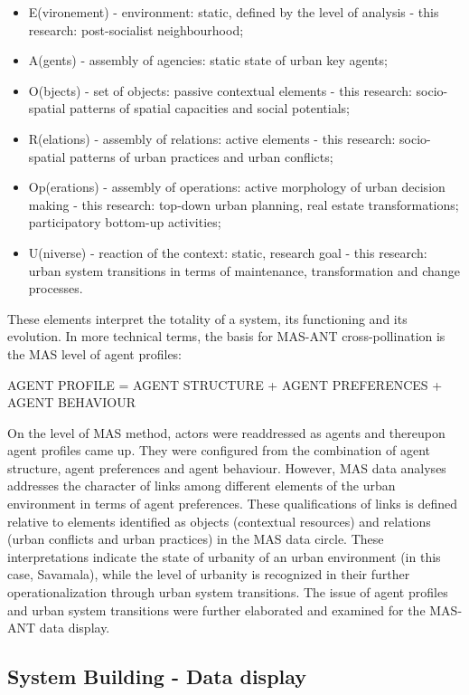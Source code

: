 \documentclass[11pt]{report}
\begin{document}
\begin{itemize}
\item E(vironement) - environment: static, defined by the level of analysis - this research: post-socialist neighbourhood;
\item A(gents) - assembly of agencies: static state of urban key agents;
\item O(bjects) - set of objects: passive contextual elements - this research: socio-spatial patterns of spatial capacities and social potentials;
\item R(elations) - assembly of relations: active elements - this research: socio-spatial patterns of urban practices and urban conflicts;
\item Op(erations) - assembly of operations: active morphology of urban decision making - this research: top-down urban planning, real estate transformations; participatory bottom-up activities;
\item U(niverse) - reaction of the context: static, research goal - this research:  urban system transitions in terms of maintenance, transformation and change processes.
\end{itemize}

These elements interpret the totality of a system, its functioning and its evolution.
In more technical terms, the basis for MAS-ANT cross-pollination is the MAS level of agent profiles:

AGENT PROFILE = AGENT STRUCTURE + AGENT PREFERENCES + AGENT BEHAVIOUR

On the level of MAS method, actors were readdressed as agents and thereupon agent profiles came up. They were configured from the combination of agent structure, agent preferences and agent behaviour.
However, MAS data analyses addresses the character of links among different elements of the urban environment in terms of agent preferences. These qualifications of links is defined relative to elements identified as objects (contextual resources) and relations (urban conflicts and urban practices) in the MAS data circle. These interpretations indicate the state of urbanity of an urban environment (in this case, Savamala), while the level of urbanity is recognized in their further operationalization through urban system transitions.
The issue of agent profiles and urban system transitions were further elaborated and examined for the MAS-ANT data display.

\subsection{System Building - Data display}
\end{document}
